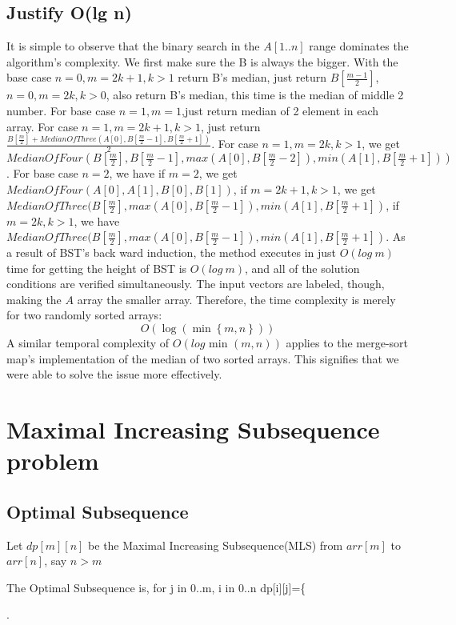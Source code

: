 \documentclass[a4paper]{article}
\begin{document}
\subsection{ Justify O(lg n)}
It is simple to observe that the binary search in the $A[1..n]$ range dominates the algorithm's complexity. We first make sure the B is always the bigger. With the base case $n=0,m=2k+1,k>1$ return B's median, just return $B[\frac{m-1}2]$, $n=0,m=2k,k>0$, also return B's median, this time is the median of middle 2 number. For base case $n=1, m=1$,just return median of 2 element in each array. For case $n=1,m=2k+1,k>1$, just return $\frac{B[\frac{m}{2}] + MedianOfThree(A[0], B[\frac{m}{2} - 1], B[\frac{m}{2} + 1])}2$. For case $n=1,m=2k,k>1$, we get $MedianOfFour (B[\frac{m}{2}], B[\frac{m}{2} - 1], max( A[0], B[\frac{m}{2} - 2] ), min( A[1], B[\frac{m}{2} + 1] ))$. For base case $n=2$, we have if $m=2$, we get $MedianOfFour(A[0],A[1],B[0],B[1])$, if $m=2k+1,k>1$, we get $MedianOfThree (B[\frac{m}{2}], max(A[0], B[\frac{m}{2} - 1]), min(A[1], B[\frac{m}{2} + 1])$, if $m=2k,k>1$, we have $MedianOfThree (B[\frac{m}{2}], max(A[0], B[\frac{m}{2} - 1]), min(A[1], B[\frac{m}{2} + 1])$. As a result of BST's back ward induction, the method executes in just $O(log\ m)$ time for getting the height of BST is $O(log\ m)$, and all of the solution conditions are verified simultaneously. The input vectors are labeled, though, making the $A$ array the smaller array. Therefore, the time complexity is merely for two randomly sorted arrays:
$$
O\left(\log \left(\min \left\{m, n\right\}\right)\right) 
$$
A similar temporal complexity of $O(log\text{ min }(m, n))$ applies to the merge-sort map's implementation of the median of two sorted arrays. This signifies that we were able to solve the issue more effectively.

\section{Maximal Increasing Subsequence problem}
\subsection{Optimal Subsequence}
Let $dp[m][n]$ be the Maximal Increasing Subsequence(MLS) from $arr[m]$ to $arr[n]$, say $n>m$

The Optimal Subsequence is, for j in 0..m, i in 0..n
$$dp[i][j]=\left\{\begin{array}{l}
  dp[i][j] = 0,  i == 0 || j == 0\\
  dp[i][j] = 1 + dp[i - 1][j - 1],  arr[j - 1] == arr[i - 1]\\
  dp[i][j] = max(dp[i - 1][j], dp[i][j - 1])
}\end{array}\right.$$
\end{document}

